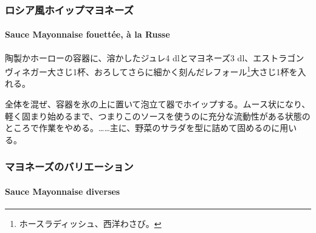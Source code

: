 \begin{recette}
\maeaki 

\hypertarget{ux30edux30b7ux30a2ux98a8ux30dbux30a4ux30c3ux30d7ux30deux30e8ux30cdux30fcux30ba}{%
\subsubsection{ロシア風ホイップマヨネーズ}\label{ux30edux30b7ux30a2ux98a8ux30dbux30a4ux30c3ux30d7ux30deux30e8ux30cdux30fcux30ba}}

\hypertarget{mayonnaise-fouette-a-la-russe}{%
\paragraph{Sauce Mayonnaise fouettée, à la
Russe}\label{mayonnaise-fouette-a-la-russe}}


陶製かホーローの容器に、溶かしたジュレ4 dlとマヨネーズ3
dl、エストラゴンヴィネガー大さじ1杯、おろしてさらに細かく刻んだレフォール\footnote{ホースラディッシュ、西洋わさび。}大さじ1杯を入れる。

全体を混ぜ、容器を氷の上に置いて泡立て器でホイップする。ムース状になり、軽く固まり始めるまで、つまりこのソースを使うのに充分な流動性がある状態のところで作業をやめる。\ldots{}\ldots{}主に、野菜のサラダを型に詰めて固めるのに用いる。

\maeaki

\hypertarget{ux30deux30e8ux30cdux30fcux30baux306eux30d0ux30eaux30a8ux30fcux30b7ux30e7ux30f3}{%
\subsubsection{マヨネーズのバリエーション}\label{ux30deux30e8ux30cdux30fcux30baux306eux30d0ux30eaux30a8ux30fcux30b7ux30e7ux30f3}}

\hypertarget{mayonnaises-divierses}{%
\paragraph{Sauce Mayonnaise diverses}\label{mayonnaises-divierses}}


\end{recette}
